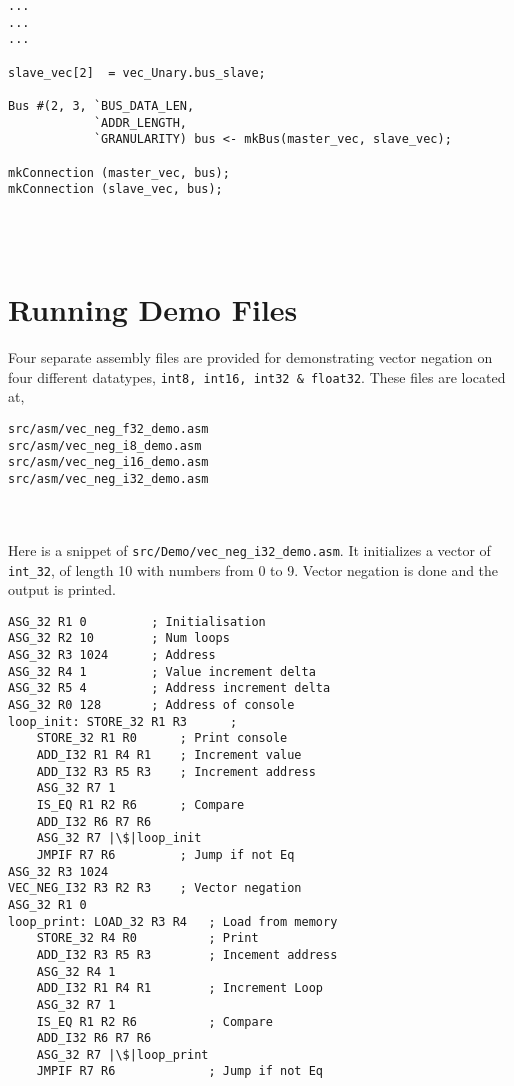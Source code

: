 \begin{paper}
\begin{verbatim}
...
...
...

slave_vec[2]  = vec_Unary.bus_slave;

Bus #(2, 3, `BUS_DATA_LEN, 
            `ADDR_LENGTH, 
            `GRANULARITY) bus <- mkBus(master_vec, slave_vec);

mkConnection (master_vec, bus);
mkConnection (slave_vec, bus);

\end{verbatim}\\\\
\section*{Running Demo Files\sdot}
Four separate assembly files are provided for demonstrating vector negation on four different datatypes, \texttt{int8, int16, int32 & float32}. These files are located at,
\begin{verbatim}
src/asm/vec_neg_f32_demo.asm
src/asm/vec_neg_i8_demo.asm
src/asm/vec_neg_i16_demo.asm
src/asm/vec_neg_i32_demo.asm
\end{verbatim}\\\\
\nointend Here is a snippet of \texttt{src/Demo/vec\_neg\_i32\_demo.asm}. It initializes a vector of \texttt{int\_32}, of length 10 with numbers from 0 to 9. Vector negation is done and the output is printed. 

\begin{verbatim}
ASG_32 R1 0         ; Initialisation
ASG_32 R2 10        ; Num loops
ASG_32 R3 1024      ; Address
ASG_32 R4 1         ; Value increment delta
ASG_32 R5 4         ; Address increment delta
ASG_32 R0 128       ; Address of console
loop_init: STORE_32 R1 R3      ;
    STORE_32 R1 R0      ; Print console
    ADD_I32 R1 R4 R1    ; Increment value
    ADD_I32 R3 R5 R3    ; Increment address
    ASG_32 R7 1
    IS_EQ R1 R2 R6      ; Compare
    ADD_I32 R6 R7 R6
    ASG_32 R7 |\$|loop_init
    JMPIF R7 R6         ; Jump if not Eq
ASG_32 R3 1024
VEC_NEG_I32 R3 R2 R3    ; Vector negation
ASG_32 R1 0
loop_print: LOAD_32 R3 R4   ; Load from memory
    STORE_32 R4 R0          ; Print
    ADD_I32 R3 R5 R3        ; Incement address
    ASG_32 R4 1
    ADD_I32 R1 R4 R1        ; Increment Loop
    ASG_32 R7 1
    IS_EQ R1 R2 R6          ; Compare
    ADD_I32 R6 R7 R6
    ASG_32 R7 |\$|loop_print
    JMPIF R7 R6             ; Jump if not Eq
\end{verbatim}\\\\


\end{paper}
